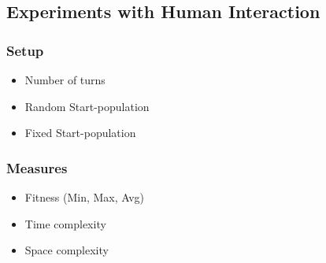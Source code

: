 \subsection{Experiments with Human Interaction}
\subsubsection{Setup}
\begin{itemize}
    \item Number of turns
    \item Random Start-population
    \item Fixed Start-population
\end{itemize}
\subsubsection{Measures}
\begin{itemize}
    \item Fitness (Min, Max, Avg)
    \item Time complexity
    \item Space complexity
\end{itemize}
